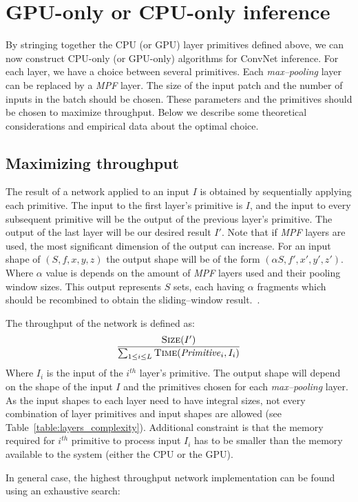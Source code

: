 \documentclass[conference]{./IEEEtran}
\begin{document}
\section{GPU-only or CPU-only inference}
  By stringing together the CPU (or GPU) layer primitives defined
  above, we can now construct CPU-only (or GPU-only) algorithms for
  ConvNet inference.  For each layer, we have a choice between several
  primitives.  Each \emph{max--pooling} layer can be replaced by
  a \emph{MPF} layer.  The size of the input patch and the number of
  inputs in the batch should be chosen.  These parameters and the
  primitives should be chosen to maximize throughput.  Below we
  describe some theoretical considerations and empirical data about
  the optimal choice.

\subsection{Maximizing throughput}
  The result of a network applied to an input $I$ is obtained by
  sequentially applying each primitive.  The input to the first layer's
  primitive is $I$, and the input to every subsequent primitive will
  be the output of the previous layer's primitive.  The output of the
  last layer will be our desired result $I'$.  Note that if \emph{MPF}
  layers are used, the most significant dimension of the output can
  increase.  For an input shape of $(S,f,x,y,z)$ the output shape will
  be of the form $(\alpha S,f',x',y',z')$.  Where $\alpha$ value is
  depends on the amount of \emph{MPF} layers used and their pooling
  window sizes.  This output represents $S$ sets, each having $\alpha$
  fragments which should be recombined to obtain the sliding--window
  result.~\cite{giusti2013fast,masci2013fast}.

  The throughput of the network is defined as:
  \[
  \frac{\proc{Size}(I')}{\sum_{1 \le i \le L}
    \proc{Time}(\id{Primitive}_i,I_i)}
  \]
  Where $I_i$ is the input of the $i^{th}$ layer's primitive.  The
  output shape will depend on the shape of the input $I$ and the
  primitives chosen for each \emph{max--pooling} layer.  As the input
  shapes to each layer need to have integral sizes, not every
  combination of layer primitives and input shapes are allowed (see
  Table~\ref{table:layers_complexity}).  Additional constraint is that
  the memory required for $i^{th}$ primitive to process input $I_i$
  has to be smaller than the memory available to the system (either
  the CPU or the GPU).

  In general case, the highest throughput network implementation can
  be found using an exhaustive search:
\end{document}
